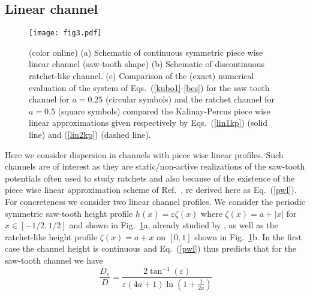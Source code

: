 \documentclass[pre,showpacs,preprintnumbers,amsmath,amssymb,superscriptaddress]{revtex4-1}
\begin{document}
{{\subsection{Linear channel}

\begin{figure}
\begin{center}
  \texttt{[image: fig3.pdf]}
  \caption{(color online) (a) Schematic of continuous symmetric piece wise linear channel (saw-tooth shape) (b) Schematic of discontinuous ratchet-like channel. 
  (c) Comparison of the (exact) numerical evaluation of the system of Eqs.~(\ref{kubo1}-\ref{bcs}) for the saw tooth channel for $a=0.25$ (circular symbols) and the ratchet channel for $a=0.5$ (square symbols) compared the Kalinay-Percus piece wise linear approximations given respectively by Eqs.~(\ref{lin1kp}) (solid line) and (\ref{lin2kp}) (dashed line).}\label{pwlfig}
\end{center}
\end{figure}

Here we consider dispersion in channels with piece wise linear profiles. Such channels are of interest as they are static/non-active realizations of the saw-tooth potentials often used to study ratchets and also because of the existence of the piece wise linear approximation scheme of Ref.~\cite{kal2006}, re derived here as Eq.~(\ref{pwl}). For concreteness we consider two linear channel profiles. We consider the periodic symmetric saw-tooth height profile $h(x) = \varepsilon\zeta(x)$ where $\zeta(x) = a +|x|$ for $x\in[-1/2,1/2]$ and shown in Fig.~\ref{pwlfig}a, already studied by \cite{ber2007,dag2010,ber2015,ver2016}, as well as the ratchet-like height profile $\zeta(x) = a + x$ on $[0,1]$ shown in Fig.~\ref{pwlfig}b. In the first case the channel height is continuous and Eq.~(\ref{pwl}) thus predicts that for the saw-tooth channel we have
\begin{equation}
\label{lin1kp}
\frac{D_e}{D} = \frac{2\tan^{-1}(\varepsilon)}{\varepsilon (4a+1) \ln(1+\frac{1}{2a})}
\end{equation}

}}
\end{document}

